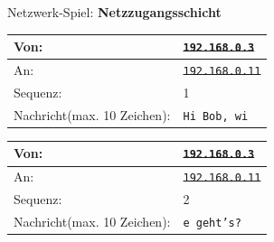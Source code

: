 \begin{frame}{Netzwerk-Spiel: \textbf{Netzzugangsschicht}}
    \begin{table}[H]
        \centering
        \begin{tabular}{p{2cm}|l}
            \rowcolor{\networkLayerColor!20} Von:                                         & \sout{\texttt{192.168.0.3}}  \\\midrule
            \rowcolor{\networkLayerColor!20} An:                                          & \sout{\texttt{192.168.0.11}} \\\midrule
            \rowcolor{\transportLayerColor!20}Sequenz:                                    & 1                            \\\midrule
            \rowcolor{\applicationLayerColor!20}Nachricht\newline\tiny (max. 10 Zeichen): & \texttt{Hi Bob, wi}          \\
        \end{tabular}
        \begin{tabular}{p{2cm}|l}
            \rowcolor{\networkLayerColor!20} Von:                                         & \sout{\texttt{192.168.0.3}}  \\\midrule
            \rowcolor{\networkLayerColor!20} An:                                          & \sout{\texttt{192.168.0.11}} \\\midrule
            \rowcolor{\transportLayerColor!20}Sequenz:                                    & 2                            \\\midrule
            \rowcolor{\applicationLayerColor!20}Nachricht\newline\tiny (max. 10 Zeichen): & \texttt{e geht's?}           \\
        \end{tabular}
    \end{table}
\end{frame}

